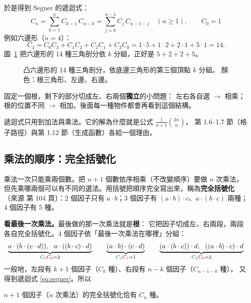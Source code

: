 \documentclass[11pt,a4paper]{article}
\newcommand{\src}[1]{{\small\color{gray!70!black}〔來源 #1〕}}  %
\begin{document}
於是得到 Segner 的遞迴式：
\begin{equation}\label{eq:segner}
\boxed{\;C_n=\sum_{k=1}^{n}C_{k-1}\,C_{n-k}=\sum_{j=0}^{n-1}C_j\,C_{n-1-j}\quad(n\ge1),\qquad C_0=1\;}
\end{equation}
例如六邊形（$n=4$）：
\[
C_4=C_0C_3+C_1C_2+C_2C_1+C_3C_0=1\cdot5+1\cdot2+2\cdot1+5\cdot1=14 .
\]
圖~\ref{fig:hexgroups} 把六邊形的 14 種三角剖分依 $k$ 分組，正好是 $5+2+2+5$。

\begin{figure}[H]
\centering
\FigTriGroups
\caption{凸六邊形的 14 種三角剖分，依底邊三角形的第三個頂點 $k$ 分組。
顏色：\textcolor{cTop}{根三角形}、\textcolor{cLeft}{左邊}、\textcolor{cRight}{右邊}。}
\label{fig:hexgroups}
\end{figure}

\begin{keybox}[整節最重要的結構]
固定一個根，剩下的部分切成左、右兩個\textbf{獨立}的小問題：
左右各自選 $\to$ 相乘；根的位置不同 $\to$ 相加。後面每一種物件都會再看到這個結構。
\end{keybox}

遞迴式只用到加法與乘法。它的解為什麼就是公式 $\frac{1}{n+1}\binom{2n}{n}$，
第 1.6--1.7 節（格子路徑）與第 1.12 節（生成函數）各給一個理由。

\subsection{乘法的順序：完全括號化}

乘法一次只能乘兩個數。把 $n+1$ 個數依序相乘（不改變順序）要做 $n$ 次乘法，
但先乘哪兩個可以有不同的選法。用括號把順序完全寫出來，稱為\textbf{完全括號化}
\src{第 104 頁}：2 個因子只有 $a\cdot b$；3 個因子有 $(a\cdot b)\cdot c$、$a\cdot(b\cdot c)$ 兩種；
4 個因子有 5 種。

\textbf{看最後一次乘法。}最後做的那一次乘法就是\textbf{根}：
它把因子切成左、右兩段，兩段各自完全括號化。4 個因子依「最後一次乘法在哪裡」分組：
\[
\underbrace{a\cdot(b\cdot(c\cdot d)),\ \ a\cdot((b\cdot c)\cdot d)}_{\textcolor{cLeft}{C_0}\textcolor{cRight}{C_2}=2}
\qquad
\underbrace{(a\cdot b)\cdot(c\cdot d)}_{\textcolor{cLeft}{C_1}\textcolor{cRight}{C_1}=1}
\qquad
\underbrace{(a\cdot(b\cdot c))\cdot d,\ \ ((a\cdot b)\cdot c)\cdot d}_{\textcolor{cLeft}{C_2}\textcolor{cRight}{C_0}=2}
\]
一般地，左段有 $k+1$ 個因子（$C_k$ 種）、右段有 $n-k$ 個因子（$C_{n-1-k}$ 種），
又得到遞迴式 \eqref{eq:segner}。所以

\begin{thmbox}[完全括號化]
$n+1$ 個因子（$n$ 次乘法）的完全括號化恰有 $C_n$ 種。
\end{thmbox}
\end{document}
